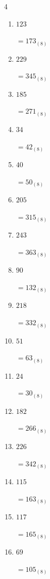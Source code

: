 \begin{multicols}{4}
\begin{enumerate}
\columnbreak %

  \item $123$

        $=173_{(8)}$

  \item $229$

        $=345_{(8)}$

  \item $185$

        $=271_{(8)}$

  \item $34$

        $=42_{(8)}$

  \item $40$

        $=50_{(8)}$

  \item $205$

        $=315_{(8)}$

  \item $243$

        $=363_{(8)}$

  \item $90$

        $=132_{(8)}$

  \item $218$

        $=332_{(8)}$

  \item $51$

        $=63_{(8)}$

  \item $24$

        $=30_{(8)}$

  \item $182$

        $=266_{(8)}$

  \item $226$

        $=342_{(8)}$

  \item $115$

        $=163_{(8)}$

  \item $117$

        $=165_{(8)}$

\columnbreak %

  \item $69$

        $=105_{(8)}$


\end{enumerate}
\end{multicols}
